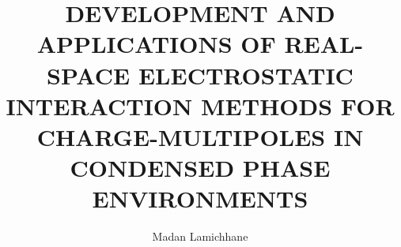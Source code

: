 \documentclass[final,numrefs,sort&compress,noinfo, twoadvisors]{nddiss2e}
\begin{document}
\frontmatter %

\title{DEVELOPMENT AND APPLICATIONS OF REAL-SPACE ELECTROSTATIC INTERACTION METHODS FOR CHARGE-MULTIPOLES IN CONDENSED PHASE ENVIRONMENTS}
\author{Madan Lamichhane}

\maketitle
%
%

\end{document}
